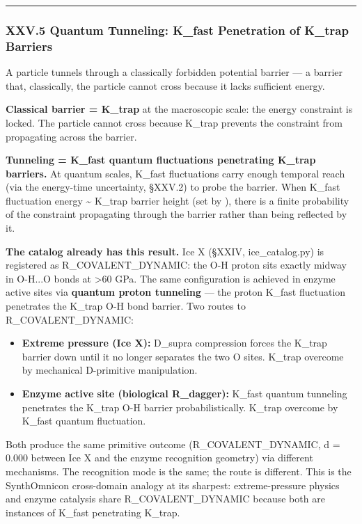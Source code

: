 \documentclass[12pt,a4paper]{article}
\begin{document}
\begin{center}
\rule{0.5\textwidth}{0.4pt}
\end{center}

\subsubsection{XXV.5 Quantum Tunneling: K\_fast Penetration of K\_trap Barriers}

A particle tunnels through a classically forbidden potential barrier --- a barrier that, classically, the particle cannot cross because it lacks sufficient energy.

\textbf{Classical barrier = K\_trap} at the macroscopic scale: the energy constraint is locked. The particle cannot cross because K\_trap prevents the constraint from propagating across the barrier.

\textbf{Tunneling = K\_fast quantum fluctuations penetrating K\_trap barriers.} At quantum scales, K\_fast fluctuations carry enough temporal reach (via the energy-time uncertainty, §XXV.2) to probe the barrier. When K\_fast fluctuation energy \textasciitilde{} K\_trap barrier height (set by \hbar), there is a finite probability of the constraint propagating through the barrier rather than being reflected by it.

\textbf{The catalog already has this result.} Ice X (§XXIV, ice\_catalog.py) is registered as R\_COVALENT\_DYNAMIC: the O-H proton sits exactly midway in O-H...O bonds at \textgreater{}60 GPa. The same configuration is achieved in enzyme active sites via \textbf{quantum proton tunneling} --- the proton K\_fast fluctuation penetrates the K\_trap O-H bond barrier. Two routes to R\_COVALENT\_DYNAMIC:

\begin{itemize}
    \item \textbf{Extreme pressure (Ice X):} D\_supra compression forces the K\_trap barrier down until it no longer separates the two O sites. K\_trap overcome by mechanical D-primitive manipulation.
    \item \textbf{Enzyme active site (biological R\_dagger):} K\_fast quantum tunneling penetrates the K\_trap O-H barrier probabilistically. K\_trap overcome by K\_fast quantum fluctuation.
\end{itemize}

Both produce the same primitive outcome (R\_COVALENT\_DYNAMIC, d = 0.000 between Ice X and the enzyme recognition geometry) via different mechanisms. The recognition mode is the same; the route is different. This is the SynthOmnicon cross-domain analogy at its sharpest: extreme-pressure physics and enzyme catalysis share R\_COVALENT\_DYNAMIC because both are instances of K\_fast penetrating K\_trap.
\end{document}
